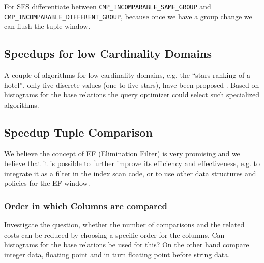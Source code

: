 For SFS differentiate between \texttt{CMP\_INCOMPARABLE\_SAME\_GROUP} and \\
\texttt{CMP\_INCOMPARABLE\_DIFFERENT\_GROUP}, because once we have
a group change we can flush the tuple window.


\subsection{Speedups for low Cardinality Domains}
A couple of algorithms for low cardinality domains, e.g.
the ``stars ranking of a hotel'', only five discrete values (one
to five stars), have been proposed \citep{Preisinger2006,
Preisinger2007, Morse2007}.  Based on histograms for the base relations
the query optimizer could select such specialized algorithms.


\subsection{Speedup Tuple Comparison}
We believe the concept of EF (Elimination Filter) is very promising
and we believe that it is possible to further improve its efficiency and effectiveness, e.g. to
integrate it as a filter in the index scan code, or to use other data
structures and policies for the EF window.


\subsubsection{Order in which Columns are compared}
Investigate the question, whether the number of comparisons and the related
costs can be reduced by choosing a specific order for the columns. Can
histograms for the base relations be used for this?  On the other hand
compare integer data, floating point and in turn floating point
before string data.


%
%

